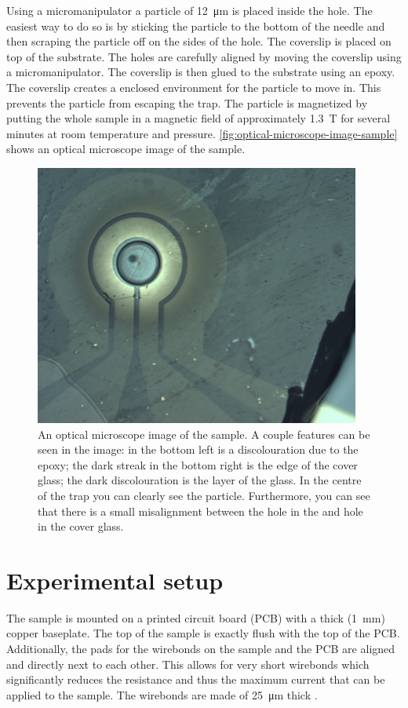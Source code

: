 Using a micromanipulator a  particle of \qty{12}{\um} is placed inside the  hole. The easiest way to do so is by sticking the particle to the bottom of the needle and then scraping the particle off on the sides of the  hole. The coverslip is placed on top of the  substrate. The holes are carefully aligned by moving the coverslip using a micromanipulator. The coverslip is then glued to the  substrate using an epoxy. The coverslip creates a enclosed environment for the particle to move in. This prevents the particle from escaping the trap. The particle is magnetized by putting the whole sample in a magnetic field of approximately \qty{1.3}{\tesla} for several minutes at room temperature and pressure. \autoref{fig:optical-microscope-image-sample} shows an optical microscope image of the sample.

\begin{figure}
    \centering
    \includegraphics{figures/sample/trap_optical_microscope.pdf}
    \caption{An optical microscope image of the sample. A couple features can be seen in the image: in the bottom left is a discolouration due to the epoxy; the dark streak in the bottom right is the edge of the cover glass; the dark discolouration is the  layer of the glass. In the centre of the trap you can clearly see the  particle. Furthermore, you can see that there is a small misalignment between the hole in the  and hole in the cover glass.}
    \label{fig:optical-microscope-image-sample}
\end{figure}

\section{Experimental setup}
The sample is mounted on a printed circuit board (PCB) with a thick (\qty{1}{\mm}) copper baseplate. The top of the sample is exactly flush with the top of the PCB. Additionally, the pads for the wirebonds on the sample and the PCB are aligned and directly next to each other. This allows for very short wirebonds which significantly reduces the resistance and thus the maximum current that can be applied to the sample. The wirebonds are made of \qty{25}{\um} thick .

